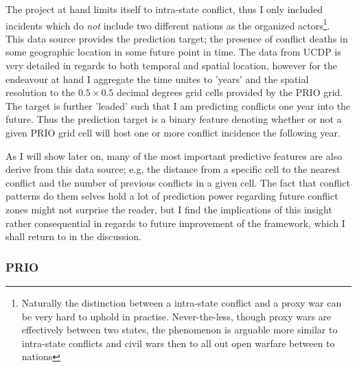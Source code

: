 \documentclass[a4paper]{article}
\begin{document}
The project at hand limits itself to intra-state conflict, thus I only included incidents which do \emph{not} include two different nations as the organized actors\footnote{Naturally the distinction between a intra-state conflict and a proxy war can be very hard to uphold in practise. Never-the-less, though proxy wars are effectively between two states, the phenomenon is arguable more similar to intra-state conflicts and civil wars then to all out open warfare between to nations}. This data source provides the prediction target; the presence of conflict deaths in some geographic location in some future point in time. The data from UCDP is very detailed in regards to both temporal and spatial location, however for the endeavour at hand I aggregate the time unites to 'years' and the spatial resolution to the $0.5\times0.5$ decimal degrees grid cells provided by the PRIO grid. The target is further 'leaded' such that I am predicting conflicts one year into the future. Thus the prediction target is a binary feature denoting whether or not a given PRIO grid cell will host one or more conflict incidence the following year.\par

As I will show later on, many of the most important predictive features are also derive from this data source; e.g. the distance from a specific cell to the nearest conflict and the number of previous conflicts in a given cell. The fact that conflict patterns do them selves hold a lot of prediction power regarding future conflict zones might not surprise the reader, but I find the implications of this insight rather consequential in regards to future improvement of the framework, which I shall return to in the discussion.\par

\subsubsection{PRIO}
\end{document}
